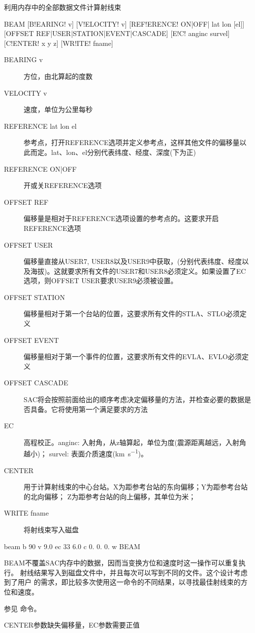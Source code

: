 \label{cmd:beam}

利用内存中的全部数据文件计算射线束

\begin{SACSTX}
BEAM [B!EARING! v] [V!ELOCITY! v] [REF!ERENCE! ON|OFF| lat lon [el]]
    [OFFSET REF|USER|STATION|EVENT|CASCADE] [E!C! anginc survel]
    [C!ENTER! x y z] [WR!ITE! fname]
\end{SACSTX}

\begin{description}
\item [BEARING v] 方位，由北算起的度数
\item [VELOCITY v] 速度，单位为公里每秒
\item [REFERENCE lat lon el] 参考点，打开REFERENCE选项并定义参考点，这样其他文件的偏移量以此而定。lat、lon、el分别代表纬度、经度、深度(下为正)
\item [REFERENCE ON|OFF] 开或关REFERENCE选项
\item [OFFSET REF] 偏移量是相对于REFERENCE选项设置的参考点的。这要求开启REFERENCE选项
\item [OFFSET USER] 偏移量直接从USER7, USER8以及USER9中获取，(分别代表纬度、经度以及海拔)。这就要求所有文件的USER7和USER8必须定义。如果设置了EC选项，则OFFSET USER要求USER9必须被设置。
\item [OFFSET STATION] 偏移量相对于第一个台站的位置，这要求所有文件的STLA、STLO必须定义
\item [OFFSET EVENT] 偏移量相对于第一个事件的位置，这要求所有文件的EVLA、EVLO必须定义
\item [OFFSET CASCADE] SAC将会按照前面给出的顺序考虑决定偏移量的方法，并检查必要的数据是否具备。它将使用第一个满足要求的方法
\item [EC] 高程校正。anginc: 入射角，从z轴算起，单位为度(震源距离越远，入射角越小)；
    survel: 表面介质速度(\si{\km\per\s})。
\item [CENTER] 用于计算射线束的中心台站。X为距参考台站的东向偏移；Y为距参考台站的北向偏移；
	Z为距参考台站的向上偏移，其单位为米；
\item [WRITE fname] 将射线束写入磁盘
\end{description}

\begin{SACDFT}
beam  b 90  v 9.0 ec 33  6.0 c  0. 0. 0. w BEAM
\end{SACDFT}

BEAM不覆盖SAC内存中的数据，因而当变换方位和速度时这一操作可以重复执行。
射线结果写入到磁盘文件中，并且每次可以写到不同的文件。这个设计考虑到了用户
的需求，即比较多次使用这一命令的不同结果，以寻找最佳射线束的方位和速度。

参见  命令。

CENTER参数缺失偏移量，EC参数需要正值

